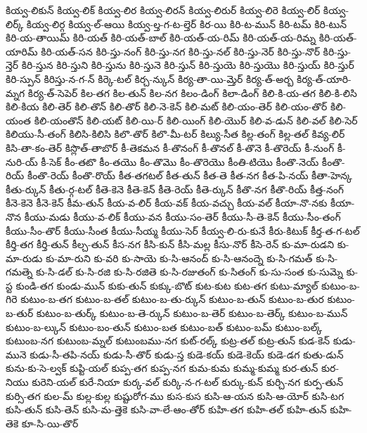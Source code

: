 {కియ్వ-లికున్
కియ్వ-లిక్
కియ్వ-లిర
కియ్వ-లిరన్
కియ్వ-లిరుర్
కియ్వ-లిరె
కియ్వ-లిర్
కియ్వ-లిర్క్
కియ్వ-లిర్గ
కియ్వ-ల్-ఆయి
కియ్వ-ల్త-గ-ట-ల్తెర్
కిర-యి
కిరి-ట-మున్
కిరి-టమ్
కిరి-టున్
కిరి-య-తాయిమ్
కిరి-యత్
కిరి-యత్-బాల్
కిరి-యత్-య-రిమ్
కిరి-యత్-య-రిమ్న
కిరి-యత్-యారిమ్
కిరి-యత్-సన
కిరి-స్తు-నంగ్
కిరి-స్తు-నగ
కిరి-స్తు-నల్
కిరి-స్తు-నెర్
కిరి-స్తు-నొర్
కిరి-స్తు-న్తెర్
కిరి-స్తున
కిరి-స్తుని
కిరి-స్తును
కిరి-స్తునె
కిరి-స్తున్
కిరి-స్తుయె
కిరి-స్తుయొ
కిరి-స్తుయ్
కిరి-స్తుర్
కిరి-స్పున్
కిరిస్తు-న-గ-న్
కిర్కె-టల్
కిర్చ-న్కున్
కిర్య-తా-యి-మ్తెర్
కిర్య-త్-అర్బ
కిర్య-త్-యారి-మ్నగ
కిర్య-త్-సెపెర్
కిల-తగ
కిల-తున్
కిల-నగ
కిలం-డింగ్
కిలా-డింగ్
కిలి-కి-య-తగ
కిలి-కి-లిసి
కిలి-కియ
కిలి-తెర్
కిలి-తొన్
కిలి-తొర్
కిలి-నె-కెన్
కిలి-మట్
కిలి-యం-తెర్
కిలి-యం-తొర్
కిలి-యంత
కిలి-యంతొన్
కిలి-యట్
కిలి-యి-ర్
కిలి-యింగ్
కిలి-యొర్
కిలి-వ-డున్
కిలి-వల్
కిలి-సెర్
కిలియు-సీ-తంగ్
కిలిసి-కిలిసి
కిలొ-తొర్
కిలొ-మీ-టర్
కిల్యు-సీత
కిల్ల-తంగ్
కిల్ల-తల్
కివ్య-లిర్
కిసి-తా-కం-తెర్
కిస్లొత్-తాబొర్
కీ-తెకమన
కీ-తొనంగ్
కీ-తొనల్
కీ-తొనె
కీ-తొరెయ్
కీ-నుంగ్
కీ-నురి-య్
కీ-సెక్
కీం-తటొ
కీం-తయొ
కీం-తొమొ
కీం-తొరెయొ
కీంతి-టియొ
కీంతొ-నెయ్
కీంతొ-రియ్
కీంతొ-రెయ్
కీంతొ-రొయ్
కీత-తగటల్
కీత-తున్
కీత-తె
కీత-నగ
కీత-పి-నయ్
కీతా-హెన్క
కీతు-ర్కున్
కీతు-ర్గ-టల్
కీతె-కెనె
కీతె-కెన్
కీతె-రెయ్
కీతె-ర్కున్
కీతొ-నగ
కీతొ-రియ్
కీత్త-నంగ్
కీనె-కెనె
కీనె-కెన్
కీమ-తున్
కీయ-వ-లిర్
కీయ-వక్
కీయ-వచ్చు
కీయ-వల్
కీయా-నొ-నకు
కీయా-నొన
కీయు-మడు
కీయు-వ-లిక్
కీయు-వన
కీయు-సం-తెర్
కీయు-సీ-తె-కెన్
కీయు-సీం-తంగ్
కీయు-సీం-తొర్
కీయు-సీంత
కీయు-సీయ్మ
కీయు-సెర్
కీయ్వ-లి-రు-కునే
కీరు-కిటుక్
కీర్త-త-గ-టల్
కీర్తి-తగ
కీర్తి-తున్
కీల్చ-తున్
కీస-నగ
కీసి-కున్
కీసి-మల్ల
కీసు-నొర్
కీసె-రెన్
కు-మా-రుడని
కు-మా-రుడు
కు-మా-రుని
కు-వరి
కు-సాయె
కు-సి-ఆనంద్
కు-సి-ఆనంద్నె
కు-సి-గమత్
కు-సి-గమత్నె
కు-సి-డల్
కు-సి-రజి
కు-సి-రజితె
కు-సి-రజుతంగ్
కు-సితంగ్
కు-సు-సంత
కు-సుమ్నె
కు-స్ట
కుండి-తగ
కుండు-మున్
కుకు-తున్
కుక్కు-బొట్
కుట-కుట
కుట-తగ
కుటు-మ్యాల్
కుటుం-బ-గిరె
కుటుం-బ-తగ
కుటుం-బ-తల్
కుటుం-బ-తు-ర్కున్
కుటుం-బ-తున్
కుటుం-బ-తుర
కుటుం-బ-తుర్
కుటుం-బ-తుర్క్
కుటుం-బ-తె-ర్కున్
కుటుం-బ-తెర్
కుటుం-బ-తెర్క్
కుటుం-బ-మున్
కుటుం-బ-ల్కున్
కుటుం-బం-తున్
కుటుం-బత
కుటుం-బత్
కుటుం-బమ్
కుటుం-బల్క్
కుటుంబ-నగ
కుటుంబ-మ్నల్
కుటుంబము-నగ
కుట్-రల్క్
కుట్ర-తల్
కుట్ర-తున్
కుడ-కెన్
కుడు-మునె
కుడు-సీ-తపి-నయ్
కుడు-సీ-తొర్
కుడు-స్త
కుడె-కయ్
కుడె-కెయ్
కుడె-డగ
కుతు-డున్
కును-కు-సె-ల్వక్
కుప్టి-యల్
కుప్ప-తగ
కుప్ప-నగ
కుమ-కుమ
కుమ్మ-కుమ్మ
కుర-తున్
కుర-నియు
కురెని-యల్
కురే-నియా
కుర్క-వల్
కుర్కి-న-గ-టల్
కుర్కు-కున్
కుర్చి-నగ
కుర్ప-తున్
కుర్సి-తగ
కుల-మ్
కుల్ల-కుల్ల
కుష్టురోగ-ము
కుస-కుస
కుసి-ఆ-యన
కుసి-ఆ-యోర్
కుసి-టగ
కుసి-తున్
కుసి-తెన్
కుసి-మ-త్తెకె
కుసి-వా-లే-ఆం-తోర్
కుహి-తగ
కుహి-తల్
కుహి-తున్
కుహి-తెకె
కూ-సి-యి-తొర్
}
